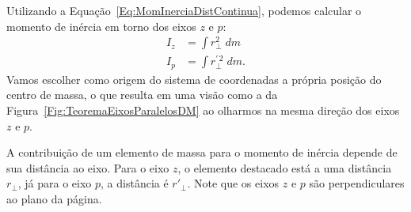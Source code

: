 Utilizando a Equação~\eqref{Eq:MomInerciaDistContinua}, podemos calcular o momento de inércia em torno dos eixos $z$ e $p$:
\begin{align}
    I_z &= \int r_\perp^2 \;dm \\
    I_p &= \int r_\perp^{\prime \, 2} \;dm. \label{Eq:TeorEixosParalelosDefIp}
\end{align}
%
Vamos escolher como origem do sistema de coordenadas a própria posição do centro de massa, o que resulta em uma visão como a da Figura~\ref{Fig:TeoremaEixosParalelosDM} ao olharmos na mesma direção dos eixos $z$ e $p$. 

\begin{marginfigure}
\centering
{}
\caption{A contribuição de um elemento de massa para o momento de inércia depende de sua distância ao eixo. Para o eixo $z$, o elemento destacado está a uma distância $r_\perp$, já para o eixo $p$, a distância é $r'_\perp$. Note que os eixos $z$ e $p$ são perpendiculares ao plano da página.\label{Fig:TeoremaEixosParalelosDM}}
\end{marginfigure}

